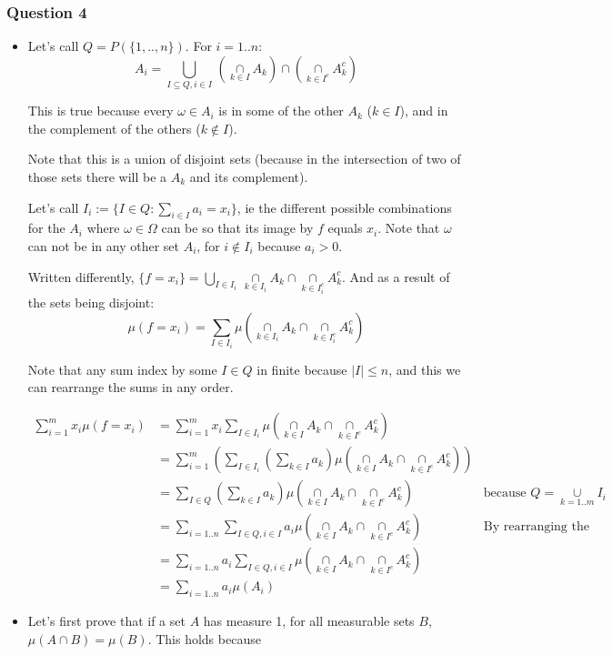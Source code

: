 \documentclass[12pt]{article}
\newcommand{\Q}[1]{\subsubsection*{Question #1}}
\newcommand{\union}[1]{\underset{#1}{\cup} }
\newcommand{\bigunion}[1]{\underset{#1}{\bigcup} \, }
\newcommand{\inter}[1]{\underset{#1}{\cap} }
\begin{document}
\Q{4}

\begin{itemize}

\item
Let's call $Q = P(\{1,..,n\})$. For $i = 1 .. n$:
$$A_i = \bigunion{I \subseteq Q, i \in I} (\inter{k \in I} A_k) \inter{} (\inter{k \in I^c} A_k^c) $$

This is true because every $\omega \in A_i$ is in some of the other $A_k$ ($k \in I$), and in the complement of the others ($k \not \in I$).


Note that this is a union of disjoint sets (because in the intersection of two of those sets there will be a $A_k$ and its complement).


Let's call $I_i := \{ I \in Q: \sum_{i \in I} a_i = x_i\}$, ie the different possible combinations for the $A_i$ where $\omega \in \Omega$ can be so that its image by $f$ equals $x_i$. Note that $\omega$ can not be  in any other set $A_i$, for $i \not \in I_i$ because $a_i > 0$.


Written differently, $\{ f = x_i \} = \bigunion{I \in I_i} \inter{k \in I_i} A_k \inter{} \inter{k \in I_i^c} A_k^c$. And as a result of the sets being disjoint: 
$$ \mu(f = x_i) = \sum_{I \in I_i} \mu(\inter{k \in I_i} A_k \inter{} \inter{k \in I_i^c} A_k^c)$$


Note that any sum index by some $I \in Q$ in finite because $|I| \leq n$, and this we can rearrange the sums in any order.

\begin{align*}
\sum_{i=1}^m x_i \mu(f = x_i) 
&= \sum_{i=1}^m x_i \sum_{I \in I_i} \mu(\inter{k \in I} A_k \inter{} \inter{k \in I^c} A_k^c) \\
&= \sum_{i=1}^m  \left(\sum_{I \in I_i} (\sum_{k \in I} a_k) \mu(\inter{k \in I} A_k \inter{} \inter{k \in I^c} A_k^c)\right) \\
&= \sum_{I \in Q} (\sum_{k \in I} a_k) \mu(\inter{k \in I} A_k \inter{} \inter{k \in I^c} A_k^c) 
& \text{because $Q = \union{k=1..m} I_i$} \\
&= \sum_{i=1..n} \sum_{I \in Q, i \in I} a_i \mu(\inter{k \in I} A_k \inter{} \inter{k \in I^c} A_k^c) 
& \text{By rearranging the sum}\\
&= \sum_{i=1..n} a_i \sum_{I \in Q, i \in I}  \mu(\inter{k \in I} A_k \inter{} \inter{k \in I^c} A_k^c) \\
&= \sum_{i=1..n} a_i \mu(A_i)
\end{align*}

\item
Let's first prove that if a set $A$ has measure 1, for all measurable sets $B$, $\mu(A \inter{} B) = \mu(B)$. This holds because 


\end{itemize}
\end{document}

